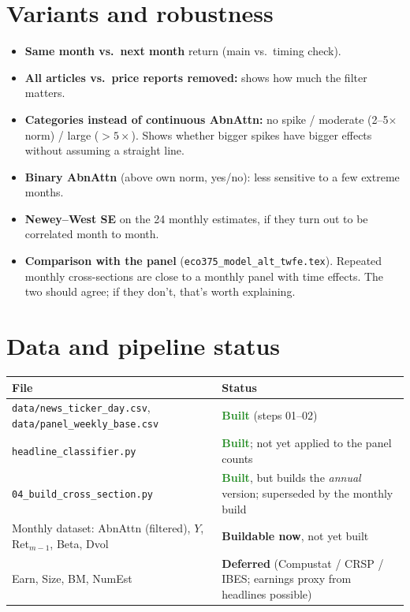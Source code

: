 \documentclass[11pt]{article}
\newcommand{\done}{\textcolor{ForestGreen}{\textbf{Built}}}
\newcommand{\canbuild}{\textcolor{TealBlue}{\textbf{Buildable now}}}
\newcommand{\dl}{\textcolor{BurntOrange}{\textbf{Deferred}}}
\newcommand{\var}[1]{\texttt{#1}}
\begin{document}
\section{Variants and robustness}
\begin{itemize}
  \item \textbf{Same month vs.\ next month} return (main vs.\ timing check).
  \item \textbf{All articles vs.\ price reports removed:} shows how much the filter matters.
  \item \textbf{Categories instead of continuous AbnAttn:} no spike / moderate (2--5$\times$ norm) / large ($>5\times$). Shows whether bigger spikes have bigger effects without assuming a straight line.
  \item \textbf{Binary AbnAttn} (above own norm, yes/no): less sensitive to a few extreme months.
  \item \textbf{Newey--West SE} on the 24 monthly estimates, if they turn out to be correlated month to month.
  \item \textbf{Comparison with the panel} (\var{eco375\_model\_alt\_twfe.tex}). Repeated monthly cross-sections are close to a monthly panel with time effects. The two should agree; if they don't, that's worth explaining.
\end{itemize}

\section{Data and pipeline status}

\begin{center}
\begin{tabularx}{\textwidth}{>{\raggedright}p{5.4cm} >{\raggedright\arraybackslash}X}
\toprule
File & Status\\
\midrule
\var{data/news\_ticker\_day.csv}, \var{data/panel\_weekly\_base.csv} & \done{} (steps 01--02)\\
\var{headline\_classifier.py} & \done{}; not yet applied to the panel counts\\
\var{04\_build\_cross\_section.py} & \done{}, but builds the \emph{annual} version; superseded by the monthly build\\
Monthly dataset: AbnAttn (filtered), $Y$, Ret$_{m-1}$, Beta, Dvol & \canbuild{}, not yet built\\
Earn, Size, BM, NumEst & \dl{} (Compustat / CRSP / IBES; earnings proxy from headlines possible)\\
\bottomrule
\end{tabularx}
\end{center}
\end{document}
